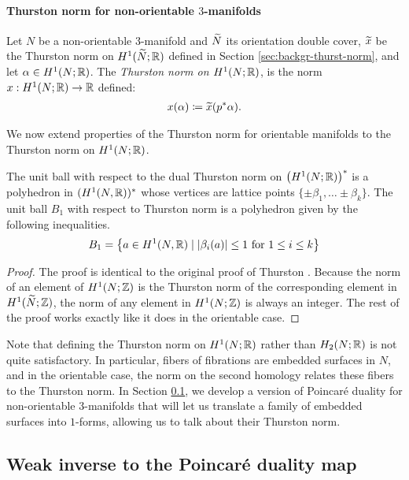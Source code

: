 \paragraph{Thurston norm for non-orientable $3$-manifolds}
  Let $N$ be a non-orientable 3-manifold and $\widetilde{N}$ its orientation double cover, $\widetilde{x}$ be the Thurston norm on $H^1(\widetilde{N};\mathbb{R})$ defined in Section \ref{sec:backgr-thurst-norm}, and let $\alpha \in H^1(N;\mathbb{R})$.
  The \emph{Thurston norm on $H^1(N; \mathbb{R})$}, is the norm $x: H^1(N;\mathbb{R}) \rightarrow \mathbb{R}$ defined:
  \begin{align*}
    x(\alpha) \coloneqq \widetilde{x}(p^{\ast}\alpha).
  \end{align*}

We now extend properties of the Thurston norm for orientable manifolds to the Thurston norm on $H^1(N;\mathbb{R})$.
\begin{thm}
  The unit ball with respect to the dual Thurston norm on $\left( H^1(N; \mathbb{R}) \right)^{\ast}$ is a polyhedron in $(H^1(N,\mathbb{R}))^\ast$ whose vertices are lattice points $\{\pm \beta_1, \ldots \pm \beta_k\}$.
  The unit ball $B_1$ with respect to Thurston norm is a polyhedron given by the following inequalities.
  \begin{align*}
    B_1 = \left\{ a\in H^1(N,\mathbb{R}) \mid \left| \beta_i(a) \right| \leq 1 \text{ for $1\leq i \leq k$} \right\}
  \end{align*}
\end{thm}

\begin{proof}
  The proof is identical to the original proof of Thurston \cite[Theorem 2]{thurston1986norm}.
  Because the norm of an element of $H^1(N; \mathbb{Z})$ is the Thurston norm of the corresponding element in $H^1(\widetilde{N}; \mathbb{Z})$, the norm of any element in $H^1(N; \mathbb{Z})$ is always an integer.
  The rest of the proof works exactly like it does in the orientable case.
\end{proof}

Note that defining the Thurston norm on $H^1(N; \mathbb{R})$ rather than $H_2(N; \mathbb{R})$ is not quite satisfactory.
In particular, fibers of fibrations are embedded surfaces in $N$, and in the orientable case, the norm on the second homology relates these fibers to the Thurston norm.
In Section \ref{sec:weak-inverse-poinc}, we develop a version of Poincar\'e duality for non-orientable 3-manifolds that will let us translate a family of embedded surfaces into $1$-forms, allowing us to talk about their Thurston norm.

\subsection{Weak inverse to the Poincar\'e duality map}
\label{sec:weak-inverse-poinc}

